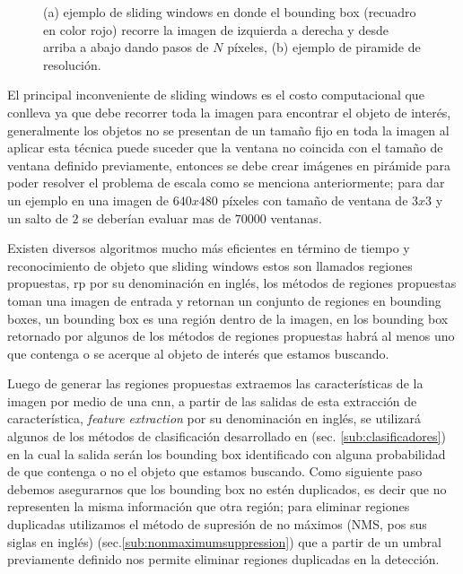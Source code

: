 \begin{figure}[htbp]
\centering
{}

\caption{(a) ejemplo de sliding windows en donde el bounding box (recuadro en color rojo) recorre la imagen de izquierda a derecha y desde arriba a abajo dando pasos de $N$ píxeles, (b) ejemplo de piramide de resolución.}\label{Fig:sliding}
\end{figure}


El principal inconveniente de sliding windows es el costo computacional que conlleva ya que debe recorrer toda la imagen para encontrar el objeto de interés, generalmente los objetos no se presentan de un tamaño fijo en toda la imagen al aplicar esta técnica puede suceder que la ventana no coincida con el tamaño de ventana definido previamente, entonces se debe crear imágenes en pirámide para poder resolver el problema de escala como se menciona anteriormente; para dar un ejemplo en una imagen de $640 x 480$ píxeles con tamaño de ventana de $ 3 x 3$ y un salto de $2$ se deberían evaluar mas de $70000$ ventanas.

Existen diversos algoritmos mucho más eficientes en término de tiempo y reconocimiento de objeto que sliding windows estos son llamados regiones propuestas, \ac{rp} por su denominación en inglés, los métodos de regiones propuestas toman una imagen de entrada y retornan un conjunto de regiones en bounding boxes, un bounding box es una región dentro de la imagen, en los bounding box retornado por algunos de los métodos de regiones propuestas habrá al menos uno que contenga o se acerque al objeto de interés que estamos buscando.

Luego de generar las regiones propuestas extraemos las características de la imagen por medio de una \ac{cnn}, a partir de las salidas de esta extracción de característica, \textit{feature extraction} por su denominación en inglés, se utilizará algunos de los métodos de clasificación desarrollado en (sec. \ref{sub:clasificadores}) en la cual la salida serán los bounding box identificado con alguna probabilidad de que contenga o no el objeto que estamos buscando. Como siguiente paso debemos  asegurarnos que los bounding box no estén duplicados, es decir que no representen la misma información que otra región; para eliminar regiones duplicadas utilizamos el método de supresión de no máximos (NMS, pos sus siglas en inglés) (sec.\ref{sub:nonmaximumsuppression}) que a partir de un umbral previamente definido nos permite eliminar regiones duplicadas en la detección.



